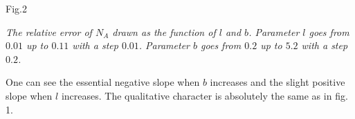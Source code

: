 \begin{center}
Fig.2
\end{center}


{ \it
 The relative error of $N_A$ drawn as the function of $l$ and $b$.
Parameter $l$ goes from $0.01$ up to $0.11$ with a step $0.01$.
Parameter $b$ goes from $0.2$ up to $5.2$ with a step $0.2$.

One can see the essential negative slope when $b$ increases and the slight
positive slope when $l$ increases. The qualitative character is absolutely
the same as in fig. 1.

}





